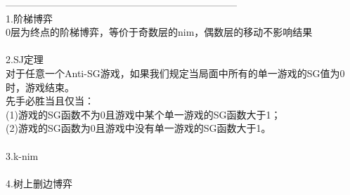 ﻿-----------------------------------------------------------------------\\
1.阶梯博弈\\
0层为终点的阶梯博弈，等价于奇数层的nim，偶数层的移动不影响结果 \\
\\
2.SJ定理\\
对于任意一个Anti-SG游戏，如果我们规定当局面中所有的单一游戏的SG值为0时，游戏结束。\\
先手必胜当且仅当：\\
(1)游戏的SG函数不为0且游戏中某个单一游戏的SG函数大于1；\\
(2)游戏的SG函数为0且游戏中没有单一游戏的SG函数大于1。\\
\\
3.k-nim\\
\\
4.树上删边博弈\\
\\